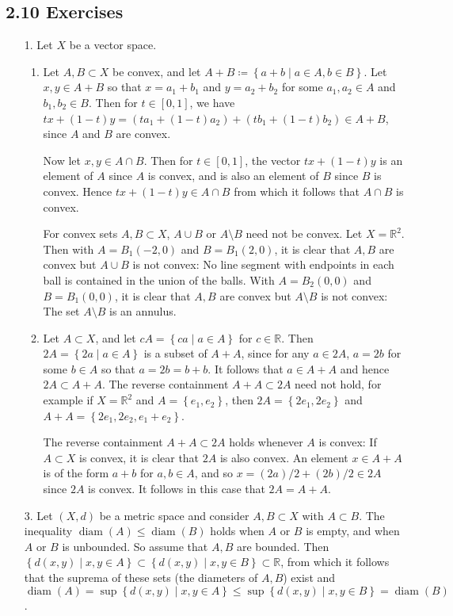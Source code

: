 \documentclass[11pt,leqno]{article}
\theoremstyle{plain}
\theoremstyle{definition}
\numberwithin{equation}{section}
\numberwithin{lem}{section}
\newcommand{\cbr}[1]{\left\{#1\right\}}
\DeclareMathOperator{\diam}{diam}
\begin{document}
\subsection*{2.10 Exercises}
\begin{enumerate}
  \item[1.] Let $X$ be a vector space.
  \begin{enumerate}
    \item Let $A,B\subset X$ be convex, and let $A+B \coloneqq \cbr{a+b\mid a\in A,b\in B}$. Let $x,y\in A+B$ so that $x = a_1+b_1$ and $y = a_2+b_2$ for some $a_1,a_2\in A$ and $b_1,b_2\in B$. Then for $t\in [0,1]$, we have $tx+(1-t)y = (ta_1 + (1-t)a_2) + (tb_1 + (1-t)b_2)\in A+B$, since $A$ and $B$ are convex.
    
    Now let $x,y\in A\cap B$. Then for $t\in [0,1]$, the vector $tx + (1-t)y$ is an element of $A$ since $A$ is convex, and is also an element of $B$ since $B$ is convex. Hence $tx + (1-t)y\in A\cap B$ from which it follows that $A\cap B$ is convex.

    For convex sets $A,B\subset X$, $A\cup B$ or $A\setminus B$ need not be convex. Let $X = \mathbb R^2$. Then with $A = B_1(-2,0)$ and $B = B_1(2,0)$, it is clear that $A,B$ are convex but $A\cup B$ is not convex: No line segment with endpoints in each ball is contained in the union of the balls. With $A = B_2(0,0)$ and $B = B_1(0,0)$, it is clear that $A,B$ are convex but $A\setminus B$ is not convex: The set $A\setminus B$ is an annulus.

    \item Let $A\subset X$, and let $cA = \cbr{ca\mid a\in A}$ for $c\in \mathbb R$. Then $2A = \cbr{2a\mid a\in A}$ is a subset of $A + A$, since for any $a\in 2A$, $a = 2b$ for some $b\in A$ so that $a = 2b = b+b$. It follows that $a \in A+A$ and hence $2A\subset A + A$. The reverse containment $A + A\subset 2A$ need not hold, for example if $X = \mathbb R^2$ and $A = \cbr{e_1,e_2}$, then $2A = \cbr{2e_1,2e_2}$ and $A + A =\cbr{2e_1, 2e_2, e_1 + e_2}$.
    
    The reverse containment $A + A\subset 2A$ holds whenever $A$ is convex: If $A\subset X$ is convex, it is clear that $2A$ is also convex. An element $x \in A+A$ is of the form $a+b$ for $a,b\in A$, and so $x = (2a)/2 + (2b)/2\in 2A$ since $2A$ is convex. It follows in this case that $2A = A + A$.
  \end{enumerate}

  \item[3.] Let $(X,d)$ be a metric space and consider $A,B\subset X$ with $A\subset B$. The inequality $\diam(A)\leq \diam(B)$ holds when $A$ or $B$ is empty, and when $A$ or $B$ is unbounded. So assume that $A,B$ are bounded. Then $\cbr{d(x,y)\mid x,y\in A}\subset \cbr{d(x,y)\mid x,y\in B}\subset \mathbb R$, from which it follows that the suprema of these sets (the diameters of $A,B$) exist and $\diam(A) = \sup \cbr{d(x,y)\mid x,y\in A}\leq \sup \cbr{d(x,y)\mid x,y\in B} = \diam(B)$.
  

\end{enumerate}
\end{document}
